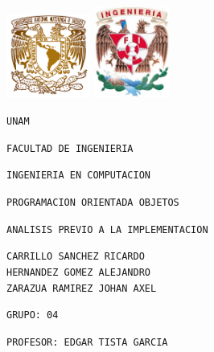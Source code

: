 \documentclass[12pt]{article}
\begin{document}
\begin{flushleft}
\includegraphics[width=2.75cm]{unam.png}\hspace{8cm} \includegraphics[width=2.5cm]{fac.png}
\end{flushleft}

\begin{center}
\begin{Huge}
\texttt{UNAM}
\end{Huge}

\vspace{0.5cm}
\begin{LARGE}
\texttt{FACULTAD DE INGENIERIA}

\vspace{0.5cm}
\texttt{INGENIERIA EN COMPUTACION}

\vspace{0.5cm}
\texttt{PROGRAMACION ORIENTADA OBJETOS}

\vspace{0.5cm}
\texttt{ANALISIS PREVIO A LA IMPLEMENTACION}

\vspace{1cm}
\end{LARGE}

\vspace{0.5cm}
\begin{LARGE}
\texttt{CARRILLO SANCHEZ RICARDO\\HERNANDEZ GOMEZ ALEJANDRO\\ZARAZUA RAMIREZ JOHAN AXEL}

\vspace{1cm}
\texttt{GRUPO: 04}

\vspace{1cm}
\texttt{PROFESOR: EDGAR TISTA GARCIA}
\end{LARGE}
\end{center}
\end{document}
